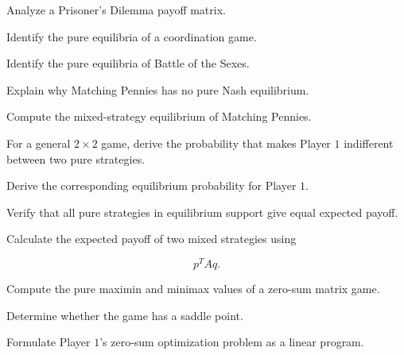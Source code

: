 \begin{exercise}[2]
Analyze a Prisoner's Dilemma payoff matrix.
\end{exercise}

\begin{exercise}[2]
Identify the pure equilibria of a coordination game.
\end{exercise}

\begin{exercise}[2]
Identify the pure equilibria of Battle of the Sexes.
\end{exercise}

\begin{exercise}[2]
Explain why Matching Pennies has no pure Nash equilibrium.
\end{exercise}

\begin{exercise}[3]
Compute the mixed-strategy equilibrium of Matching Pennies.
\end{exercise}

\begin{exercise}[3]
For a general \(2\times2\) game, derive the probability that makes
Player \(1\) indifferent between two pure strategies.
\end{exercise}

\begin{exercise}[3]
Derive the corresponding equilibrium probability for Player \(1\).
\end{exercise}

\begin{exercise}[3]
Verify that all pure strategies in equilibrium support give equal expected
payoff.
\end{exercise}

\begin{exercise}[3]
Calculate the expected payoff of two mixed strategies using

\[
p^TAq.
\]
\end{exercise}

\begin{exercise}[3]
Compute the pure maximin and minimax values of a zero-sum matrix game.
\end{exercise}

\begin{exercise}[3]
Determine whether the game has a saddle point.
\end{exercise}

\begin{exercise}[3]
Formulate Player \(1\)'s zero-sum optimization problem as a linear program.
\end{exercise}

